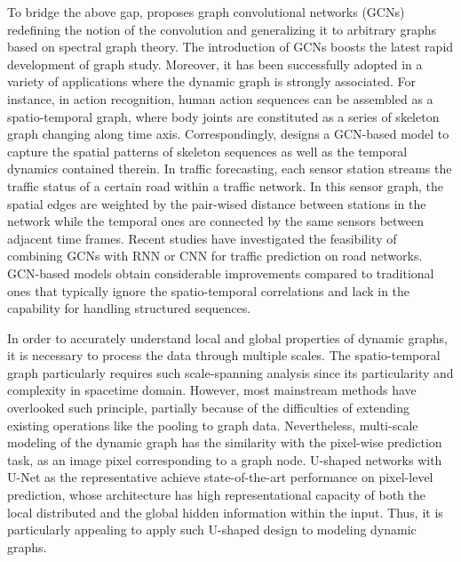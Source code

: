 \documentclass[sigconf,screen]{acmart}
\begin{document}
To bridge the above gap, \cite{bruna2013spectral} proposes graph convolutional networks (GCNs) redefining the notion of the convolution and generalizing it to arbitrary graphs based on spectral graph theory. The introduction of GCNs boosts the latest rapid development of graph study. Moreover, it has been successfully adopted in a variety of applications where the dynamic graph is strongly associated. For instance, in action recognition, human action sequences can be assembled as a spatio-temporal graph, where body joints are constituted as a series of skeleton graph changing along time axis. Correspondingly, \cite{AAAI1817103} designs a GCN-based model to capture the spatial patterns of skeleton sequences as well as the temporal dynamics contained therein. In traffic forecasting, each sensor station streams the traffic status of a certain road within a traffic network. In this sensor graph, the spatial edges are weighted by the pair-wised distance between stations in the network while the temporal ones are connected by the same sensors between adjacent time frames. Recent studies have investigated the feasibility of combining GCNs with RNN \cite{li2018dcrnn_traffic} or CNN \cite{yu2018spatio} for traffic prediction on road networks. GCN-based models obtain considerable improvements compared to traditional ones that typically ignore the spatio-temporal correlations and lack in the capability for handling structured sequences.

In order to accurately understand local and global properties of dynamic graphs, it is necessary to process the data through multiple scales. The spatio-temporal graph particularly requires such scale-spanning analysis since its particularity and complexity in spacetime domain. However, most mainstream methods have overlooked such principle, partially because of the difficulties of extending existing operations like the pooling to graph data. Nevertheless, multi-scale modeling of the dynamic graph has the similarity with the pixel-wise prediction task, as an image pixel corresponding to a graph node. U-shaped networks with U-Net \cite{ronneberger2015u} as the representative achieve state-of-the-art performance on pixel-level prediction, whose architecture has high representational capacity of both the local distributed and the global hidden information within the input. Thus, it is particularly appealing to apply such U-shaped design to modeling dynamic graphs.
\end{document}
